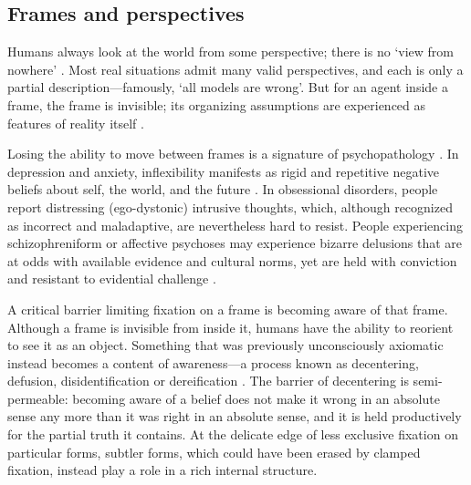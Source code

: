 \documentclass[11pt]{article}
\begin{document}



\subsection*{Frames and perspectives}
\label{sec:frames}

Humans always look at the world from some perspective; there is no `view from nowhere' \citep{nagel1986view}. Most real situations admit many valid perspectives, and each is only a partial description---famously, `all models are wrong'. But for an agent inside a frame, the frame is invisible; its organizing assumptions are experienced as features of reality itself \citep{goffman1974frame, berger1966social, wittgenstein1953philosophical}.

Losing the ability to move between frames is a signature of psychopathology \citep{kashdan2010psychological}. In depression and anxiety, inflexibility manifests as rigid and repetitive negative beliefs about self, the world, and the future \citep{beck2011cognitive}. In obsessional disorders, people report distressing (ego-dystonic) intrusive thoughts, which, although recognized as incorrect and maladaptive, are nevertheless hard to resist. People experiencing schizophreniform or affective psychoses may experience bizarre delusions that are at odds with available evidence and cultural norms, yet are held with conviction and resistant to evidential challenge \citep{adams2013computational}.

A critical barrier limiting fixation on a frame is becoming aware of that frame. Although a frame is invisible from inside it, humans have the ability to reorient to see it as an object. Something that was previously unconsciously axiomatic instead becomes a content of awareness---a process known as decentering, defusion, disidentification or dereification \citep{kegan1982evolving, bernstein2015decentering, lutz2015investigating}. The barrier of decentering is semi-permeable: becoming aware of a belief does not make it wrong in an absolute sense any more than it was right in an absolute sense, and it is held productively for the partial truth it contains. At the delicate edge of less exclusive fixation on particular forms, subtler forms, which could have been erased by clamped fixation, instead play a role in a rich internal structure. 
\end{document}
